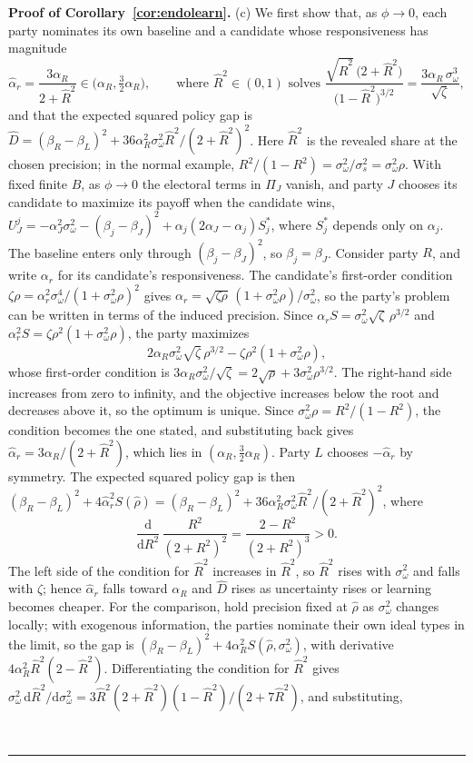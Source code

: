 \documentclass[12pt,letterpaper]{article}
\newenvironment{proof}[1][Proof]{\noindent\textbf{#1.} }{\ \rule{0.5em}{0.5em}}
\begin{document}
\begin{proof}[Proof of Corollary~\ref{cor:endolearn}]
(c) We first show that, as $\phi\to0$, each party nominates its own baseline and a candidate whose responsiveness has magnitude
\[
\widehat\alpha_r=\frac{3\alpha_R}{2+\widehat R^2}\in\Big(\alpha_R,\tfrac32\alpha_R\Big),
\qquad\text{where }\widehat R^2\in(0,1)\text{ solves }\frac{\sqrt{\widehat R^2}\,\big(2+\widehat R^2\big)}{\big(1-\widehat R^2\big)^{3/2}}=\frac{3\alpha_R\,\sigma_\omega^{3}}{\sqrt\zeta},
\]
and that the expected squared policy gap is $\widehat D=(\beta_R-\beta_L)^2+36\alpha_R^2\sigma_\omega^2\widehat R^2/(2+\widehat R^2)^2$. Here $\widehat R^2$ is the revealed share at the chosen precision; in the normal example, $R^2/(1-R^2)=\sigma_\omega^2/\sigma_s^2=\sigma_\omega^2\rho$. With fixed finite $B$, as $\phi\to0$ the electoral terms in $\Pi_J$ vanish, and party $J$ chooses its candidate to maximize its payoff when the candidate wins, $U_J^j=-\alpha_J^2\sigma_\omega^2-(\beta_j-\beta_J)^2+\alpha_j(2\alpha_J-\alpha_j)S_j^*$, where $S_j^*$ depends only on $\alpha_j$. The baseline enters only through $(\beta_j-\beta_J)^2$, so $\beta_j=\beta_J$. Consider party $R$, and write $\alpha_r$ for its candidate's responsiveness. The candidate's first-order condition $\zeta \rho=\alpha_r^2\sigma_\omega^4/(1+\sigma_\omega^2\rho)^2$ gives $\alpha_r=\sqrt{\zeta \rho}\,(1+\sigma_\omega^2\rho)/\sigma_\omega^2$, so the party's problem can be written in terms of the induced precision. Since $\alpha_r S=\sigma_\omega^2\sqrt\zeta\,\rho^{3/2}$ and $\alpha_r^2S=\zeta \rho^2(1+\sigma_\omega^2\rho)$, the party maximizes
\[
2\alpha_R \sigma_\omega^2\sqrt\zeta\,\rho^{3/2}-\zeta \rho^2(1+\sigma_\omega^2\rho),
\]
whose first-order condition is $3\alpha_R \sigma_\omega^2/\sqrt\zeta=2\sqrt \rho+3\sigma_\omega^2\rho^{3/2}$. The right-hand side increases from zero to infinity, and the objective increases below the root and decreases above it, so the optimum is unique. Since $\sigma_\omega^2\rho=R^2/(1-R^2)$, the condition becomes the one stated, and substituting back gives $\widehat\alpha_r=3\alpha_R/(2+\widehat R^2)$, which lies in $(\alpha_R,\tfrac32\alpha_R)$. Party $L$ chooses $-\widehat\alpha_r$ by symmetry. The expected squared policy gap is then $(\beta_R-\beta_L)^2+4\widehat\alpha_r^2S(\widehat \rho)=(\beta_R-\beta_L)^2+36\alpha_R^2\sigma_\omega^2\widehat R^2/(2+\widehat R^2)^2$, where
\[
\frac{\mathrm{d}}{\mathrm{d}R^2}\,\frac{R^2}{(2+R^2)^2}=\frac{2-R^2}{(2+R^2)^3}>0 .
\]
The left side of the condition for $\widehat R^2$ increases in $\widehat R^2$, so $\widehat R^2$ rises with $\sigma_\omega^2$ and falls with $\zeta$; hence $\widehat\alpha_r$ falls toward $\alpha_R$ and $\widehat D$ rises as uncertainty rises or learning becomes cheaper. For the comparison, hold precision fixed at $\widehat \rho$ as $\sigma_\omega^2$ changes locally; with exogenous information, the parties nominate their own ideal types in the limit, so the gap is $(\beta_R-\beta_L)^2+4\alpha_R^2S(\widehat \rho,\sigma_\omega^2)$, with derivative $4\alpha_R^2\widehat R^2(2-\widehat R^2)$. Differentiating the condition for $\widehat R^2$ gives $\sigma_\omega^2\,\mathrm{d}\widehat R^2/\mathrm{d}\sigma_\omega^2=3\widehat R^2(2+\widehat R^2)(1-\widehat R^2)/(2+7\widehat R^2)$, and substituting,

\end{proof}
\end{document}
